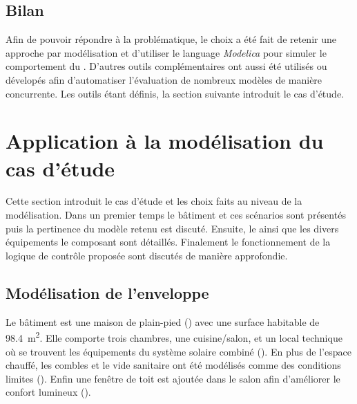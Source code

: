 \subsection{Bilan} %
\label{sub:bilan_choix_modelisation}
Afin de pouvoir répondre à la problématique, le choix a été fait de retenir une approche
par modélisation et d’utiliser le language \textit{Modelica} pour simuler le comportement
du . D’autres outils complémentaires ont aussi été utilisés ou dévelopés afin
d’automatiser l’évaluation de nombreux modèles de manière concurrente. Les outils étant
définis, la section suivante introduit le cas d’étude.


\section{Application à la modélisation du cas d’étude} %
\label{sec:application_a_la_modelisation_du_cas_d_etude}
Cette section introduit le cas d’étude et les choix faits au niveau de la modélisation.
Dans un premier temps le bâtiment et ces scénarios sont présentés puis la pertinence
du modèle retenu est discuté. Ensuite, le  ainsi que les divers équipements le
composant sont détaillés. Finalement le fonctionnement de la logique de contrôle proposée
sont discutés de manière approfondie.


\subsection{Modélisation de l’enveloppe} %
\label{sub:modelisation_de_l_enveloppe}
Le bâtiment est une maison de plain-pied () avec une surface habitable
de \SI{98.4}{\meter\squared}. Elle comporte trois chambres, une cuisine/salon, et un local
technique où se trouvent les équipements du système solaire combiné (). En plus de
l’espace chauffé, les combles et le vide sanitaire ont été modélisés comme des conditions
limites (). Enfin une fenêtre de toit est ajoutée dans
le salon afin d’améliorer le confort lumineux ().

